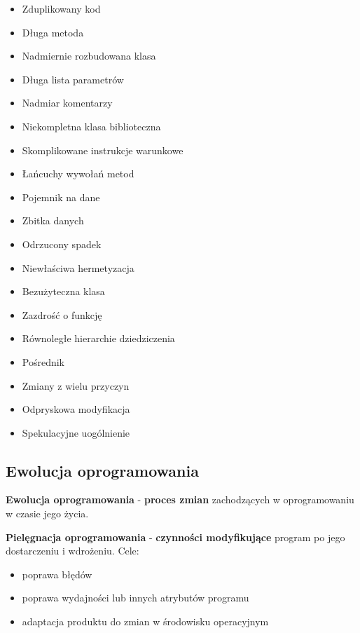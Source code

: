 \documentclass[a4paper]{article}
\begin{document}
    \begin{itemize}
        \item Zduplikowany kod
        \item Długa metoda
        \item Nadmiernie rozbudowana klasa
        \item Długa lista parametrów
        \item Nadmiar komentarzy
        \item Niekompletna klasa biblioteczna
        \item Skomplikowane instrukcje warunkowe
        \item Łańcuchy wywołań metod
        \item Pojemnik na dane
        \item Zbitka danych
        \item Odrzucony spadek
        \item Niewłaściwa hermetyzacja
        \item Bezużyteczna klasa
        \item Zazdrość o funkcję
        \item Równoległe hierarchie dziedziczenia
        \item Pośrednik
        \item Zmiany z wielu przyczyn
        \item Odpryskowa modyfikacja
        \item Spekulacyjne uogólnienie
    \end{itemize}
    \subsection{Ewolucja oprogramowania}
    \textbf{Ewolucja oprogramowania} - \textbf{proces zmian} zachodzących w oprogramowaniu
    w czasie jego życia.

    \textbf{Pielęgnacja oprogramowania} - \textbf{czynności modyfikujące} program
    po jego dostarczeniu i wdrożeniu. Cele:
    \begin{itemize}
        \item poprawa błędów
        \item poprawa wydajności lub innych atrybutów programu
        \item adaptacja produktu do zmian w środowisku operacyjnym
    \end{itemize}
\end{document}
